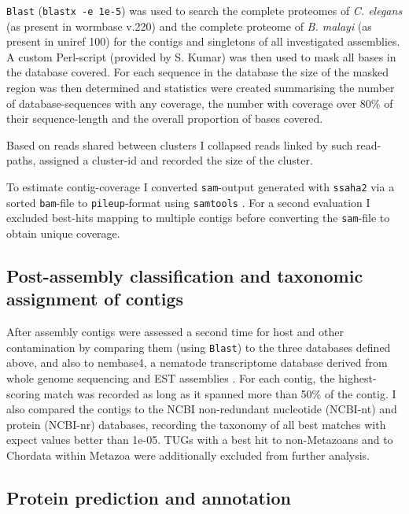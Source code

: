 \texttt{Blast} (\texttt{blastx -e 1e-5}) was used to search the
complete proteomes of \textit{C. elegans} (as present in wormbase
v.220) and the complete proteome of \textit{B. malayi} (as present in
uniref 100) for the contigs and singletons of all investigated
assemblies. A custom Perl-script (provided by S. Kumar) was then used
to mask all bases in the database covered. For each sequence in the
database the size of the masked region was then determined and
statistics were created summarising the number of database-sequences
with any coverage, the number with coverage over 80\% of their
sequence-length and the overall proportion of bases covered.

Based on reads shared between clusters I collapsed reads linked by
such read-paths, assigned a cluster-id and recorded the size of the
cluster.

To estimate contig-coverage I converted \texttt{sam}-output generated
with \texttt{ssaha2}\cite{pmid11591649} via a sorted \texttt{bam}-file
to \texttt{pileup}-format using \texttt{samtools}
\cite{journals/bioinformatics/LiHWFRHMAD09}. For a second evaluation
I excluded best-hits mapping to multiple contigs before converting the
\texttt{sam}-file to obtain unique coverage.

\subsection{Post-assembly classification and taxonomic assignment of
  contigs}

After assembly contigs were assessed a second time for host and other
contamination by comparing them (using \texttt{Blast}) to the three
databases defined above, and also to nembase4, a nematode
transcriptome database derived from whole genome sequencing and EST
assemblies \cite{parkinson_nembase:resource_2004, pmid21550347}. For
each contig, the highest-scoring match was recorded as long as it
spanned more than 50\% of the contig. I also compared the contigs to
the NCBI non-redundant nucleotide (NCBI-nt) and protein (NCBI-nr)
databases, recording the taxonomy of all best matches with expect
values better than 1e-05. TUGs with a best hit to non-Metazoans and to
Chordata within Metazoa were additionally excluded from further
analysis.

\subsection{Protein prediction and annotation}


